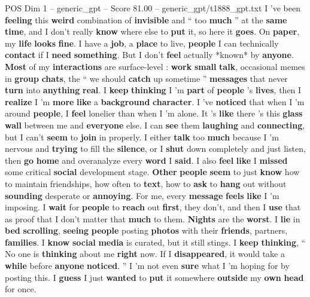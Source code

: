 \begin{textsample}{POS Dim 1 – generic\_gpt – Score 81.00 – generic\_gpt/t1888\_gpt.txt}  \label{ex:f1_pos_008}
I ’ve been \textbf{feeling} this \textbf{weird} combination of \textbf{invisible} and “ too \textbf{much} ” at the \textbf{same} \textbf{time}, and I don't really \textbf{know} where else to \textbf{put} it, so here it \textbf{goes}.
On \textbf{paper}, my \textbf{life} \textbf{looks} \textbf{fine}.
I have a \textbf{job}, a \textbf{place} to live, \textbf{people} I can technically \textbf{contact} if I \textbf{need} \textbf{something}.
But I don't \textbf{feel} actually *known* by \textbf{anyone}. \textbf{Most} of my \textbf{interactions} are surface-level : \textbf{work} \textbf{small} \textbf{talk}, occasional memes in \textbf{group} \textbf{chats}, the “ we should \textbf{catch} up sometime ” \textbf{messages} that never \textbf{turn} into \textbf{anything} \textbf{real}.
I \textbf{keep} \textbf{thinking} I ’m \textbf{part} of \textbf{people} ’s \textbf{lives}, then I \textbf{realize} I ’m \textbf{more} \textbf{like} a \textbf{background} \textbf{character}.
I ’ve \textbf{noticed} that when I ’m around \textbf{people}, I \textbf{feel} lonelier than when I ’m alone.
It ’s \textbf{like} there ’s this \textbf{glass} \textbf{wall} between me and \textbf{everyone} else.
I can \textbf{see} them \textbf{laughing} and \textbf{connecting}, but I can't \textbf{seem} to \textbf{join} in properly.
I either \textbf{talk} too \textbf{much} because I ’m nervous and \textbf{trying} to fill the \textbf{silence}, or I \textbf{shut} down completely and just listen, then \textbf{go} \textbf{home} and overanalyze every \textbf{word} I \textbf{said}.
I also \textbf{feel} \textbf{like} I \textbf{missed} some critical \textbf{social} development stage. \textbf{Other} \textbf{people} \textbf{seem} to just \textbf{know} how to maintain friendships, how often to \textbf{text}, how to \textbf{ask} to \textbf{hang} out without \textbf{sounding} desperate or \textbf{annoying}.
For me, every \textbf{message} \textbf{feels} \textbf{like} I ’m imposing.
I \textbf{wait} for \textbf{people} to \textbf{reach} out \textbf{first}, they don't, and then I \textbf{use} that as proof that I don't matter that \textbf{much} to them. \textbf{Nights} are the \textbf{worst}.
I \textbf{lie} in \textbf{bed} \textbf{scrolling}, \textbf{seeing} \textbf{people} posting \textbf{photos} with their \textbf{friends}, partners, \textbf{families}.
I \textbf{know} \textbf{social} \textbf{media} is curated, but it still stings.
I \textbf{keep} \textbf{thinking}, “ No one is \textbf{thinking} about me \textbf{right} now.
If I \textbf{disappeared}, it would take a \textbf{while} before \textbf{anyone} \textbf{noticed}. ” I ’m not even \textbf{sure} what I ’m hoping for by posting this.
I \textbf{guess} I just \textbf{wanted} to \textbf{put} it somewhere \textbf{outside} my \textbf{own} \textbf{head} for once.


\end{textsample}
